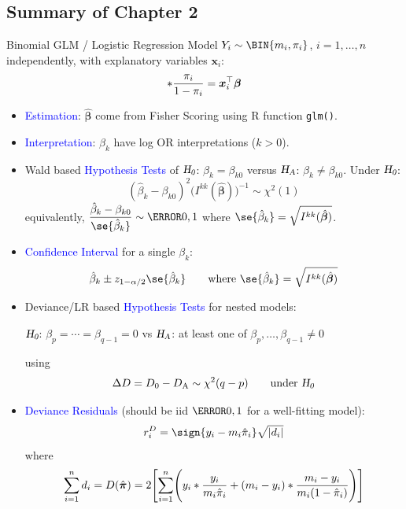 \documentclass[oneside]{book}\usepackage[]{graphicx}\usepackage[svgnames]{xcolor}
\let\log\relax%
\newcommand{\HN}{\textsl{H}_{\textsl{0}}}%
\newcommand{\HA}{\textsl{H}_{\textsl{A}}}%
\DeclarePairedDelimiter\abs{\lvert}{\rvert}
\providecommand{\Vector}[1]{\bm{#1}}%
\begin{document}
\subsection*{Summary of Chapter 2}
\begin{Regular}{Binomial GLM / Logistic Regression Model}
      $ Y_i \sim \BIN{m_i,\pi_i} $, $ i=1,\ldots,n $ independently, with explanatory variables $ \Vector{x}_i $:
      \[ \log*{\frac{\pi_i}{1-\pi_i}}=\Vector{x}_i^\top \Vector{\beta} \]
\end{Regular}
\begin{itemize}
      \item \textcolor{Blue}{Estimation}: $ \hat{\Vector{\beta}} $ come from Fisher Scoring using R function \texttt{glm()}.
      \item \textcolor{Blue}{Interpretation}: $ \beta_k $ have log OR interpretations ($ k>0 $).
      \item Wald based \textcolor{Blue}{Hypothesis Tests} of $ \HN $: $ \beta_k=\beta_{k0} $ versus $ \HA $: $ \beta_k\ne \beta_{k0} $. Under $ \HN $:
            \[ (\hat{\beta}_k-\beta_{k0})^2\bigl(I^{kk}(\hat{\Vector{\beta}})\bigr)^{-1} \sim \chi^2(1) \]
            equivalently, $ \displaystyle \frac{\hat{\beta}_k-\beta_{k0}}{\se{\hat{\beta}_k}}\sim \N{0,1}  $ where $ \se{\hat{\beta}_k}=\sqrt{I^{kk}(\hat{\Vector{\beta}})} $.
      \item \textcolor{Blue}{Confidence Interval} for a single $ \beta_k $:
            \[ \hat{\beta}_k\pm z_{1-\alpha/2}\se{\hat{\beta}_k}\qquad\text{where $\se{\hat{\beta}_k}=\sqrt{I^{kk}(\hat{\Vector{\beta}})}$} \]
      \item Deviance/LR based \textcolor{Blue}{Hypothesis Tests} for nested models:
            \begin{center}
                  $ \HN $: $ \beta_p=\cdots=\beta_{q-1}=0 $ vs $ \HA $: at least one of $ \beta_p,\ldots,\beta_{q-1}\ne 0 $
            \end{center}
            using
            \[ \Delta D=D_0-D_\text{A} \sim \chi^2(q-p)\qquad\text{under $ \HN $} \]
      \item \textcolor{Blue}{Deviance Residuals} (should be iid $ \N{0,1} $ for a well-fitting model):
            \[ r_i^D=\sign{y_i-m_i\hat{\pi}_i}\sqrt{\abs{d_i}} \]
            where
            \[ \sum_{i=1}^{n} d_i=D(\hat{\Vector{\pi}})=
                  2\Biggl[\sum_{i=1}^{n} \Biggl(y_i\log*{\frac{y_i}{m_i\hat{\pi}_i}}+(m_i-y_i)\log*{\frac{m_i-y_i}{m_i(1-\hat{\pi}_i)}}\Biggr)\Biggr] \]

\end{itemize}
\end{document}
